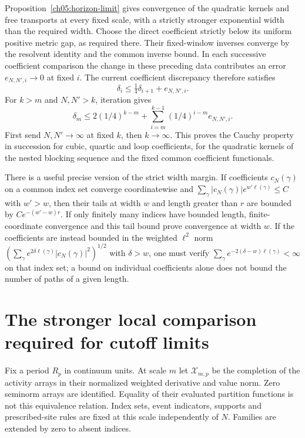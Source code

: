 Proposition~\ref{ch05:horizon-limit} gives convergence of the
quadratic kernels and free transports at every fixed scale, with a
strictly stronger exponential width than the required width. Choose
the direct coefficient strictly below its uniform positive metric
gap, as required there.
Their fixed-window inverses converge by the resolvent identity and the
common inverse bound. In each successive coefficient comparison the
change in these preceding data contributes an error
$e_{N,N',i}\to0$ at fixed $i$. The current coefficient discrepancy
therefore satisfies
\[
 \delta_i\le\tfrac14\delta_{i+1}+e_{N,N',i}.
\]
For $k>m$ and $N,N'>k$, iteration gives
\begin{equation}\label{ch10:path-truncation}
 \delta_m\le2(1/4)^{k-m}
             +\sum_{i=m}^{k-1}(1/4)^{i-m}e_{N,N',i}.
\end{equation}
First send $N,N'\to\infty$ at fixed $k$, then $k\to\infty$.
This proves the Cauchy property in succession for cubic, quartic and
loop coefficients, for the quadratic kernels of the nested blocking sequence and the fixed common coefficient functionals.

There is a useful precise version of the strict width margin. If coefficients
$c_N(\gamma)$ on a common index set converge coordinatewise and
$\sum_\gamma |c_N(\gamma)|e^{w'\ell(\gamma)}\le C$ with $w'>w$,
then their tails at width $w$ and length greater than $r$ are bounded
by $Ce^{-(w'-w)r}$. If only finitely many indices have
bounded length, finite-coordinate convergence and this tail bound
prove convergence at width $w$. If the coefficients are instead bounded in the weighted $\ell^2$ norm $(\sum_\gamma e^{2\delta\ell(\gamma)}|c_N(\gamma)|^2)^{1/2}$ with $\delta>w$, one
must verify $\sum_\gamma e^{-2(\delta-w)\ell(\gamma)}<\infty$ on that index set;
a bound on individual coefficients alone does not bound the number of
paths of a given length.

\section{The stronger local comparison required for cutoff limits}
\label{ch10:comparison-input}

Fix a period $R_p$ in continuum units. At scale $m$ let $\mathcal X_{m,p}$ be
the completion of the activity arrays in their normalized
weighted derivative and value norm. Zero seminorm arrays are
identified. Equality of their evaluated partition functions is not
this equivalence relation. Index sets, event indicators, supports and prescribed-site
rules are fixed at this scale independently of $N$. Families are extended
by zero to absent indices.

